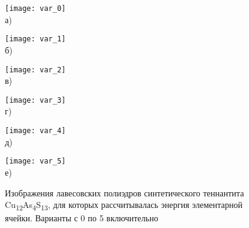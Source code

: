 \begin{figure}[p!]
  \begin{minipage}[ht]{0.45\linewidth}\centering
    \texttt{[image: var\_0]} \\ а)
  \end{minipage}
						\hfill
 \begin{minipage}[ht]{0.45\linewidth}\centering
    \texttt{[image: var\_1]} \\ б)
  \end{minipage}
\vfill

  \begin{minipage}[ht]{0.45\linewidth}\centering
    \texttt{[image: var\_2]} \\ в)
  \end{minipage}
						\hfill
 \begin{minipage}[ht]{0.45\linewidth}\centering
    \texttt{[image: var\_3]} \\ г)
  \end{minipage}
\vfill

  \begin{minipage}[ht]{0.45\linewidth}\centering
    \texttt{[image: var\_4]} \\ д)
  \end{minipage}
						\hfill
 \begin{minipage}[ht]{0.45\linewidth}\centering
    \texttt{[image: var\_5]} \\ е)
  \end{minipage}
      \caption[Изображения лавесовских полиэдров синтетического теннантита Cu\textsubscript{12}As\textsubscript{4}S\textsubscript{13}, для которых рассчитывалась энергия элементарной ячейки. Варианты с 0 по 5 включительно]{Изображения лавесовских полиэдров синтетического теннантита Cu\textsubscript{12}As\textsubscript{4}S\textsubscript{13}, для которых рассчитывалась энергия элементарной ячейки. Варианты с 0 по 5 включительно}
    \label{img:laves1}
\end{figure}

